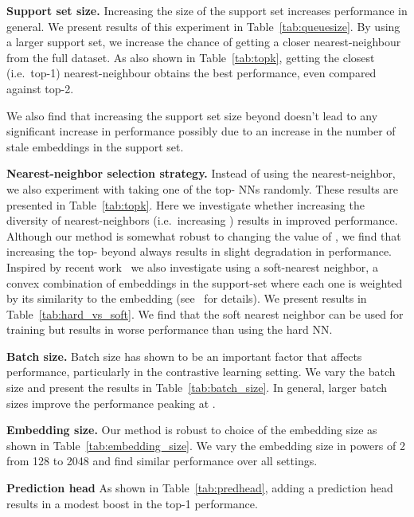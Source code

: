 \noindent \textbf{Support set size.} Increasing the size of the support set increases performance in general. We present results of this experiment in Table~\ref{tab:queuesize}.  
By using a larger support set, we increase the chance of getting a closer nearest-neighbour from the full dataset. As also shown in Table~\ref{tab:topk}, getting the closest (i.e.\ top-1) nearest-neighbour obtains the best performance, even compared against top-2. 

We also find that increasing the support set size beyond  doesn't lead to any significant increase in performance possibly due to an increase in the number of stale embeddings in the support set.




\noindent \textbf{Nearest-neighbor selection strategy.} 
Instead of using the nearest-neighbor, we also experiment with taking one of the top- NNs randomly. These results are presented in Table~\ref{tab:topk}. Here we investigate whether increasing the diversity of nearest-neighbors (i.e.\ increasing ) results in improved performance. 
Although our method is somewhat robust to changing the value of , we find that increasing the top- beyond  always results in slight degradation in performance. 
Inspired by recent work~\cite{dwibedi2019temporal, frosst2019analyzing} we also investigate using a soft-nearest neighbor, a convex combination of embeddings in the support-set where each one is weighted by its similarity to the embedding (see~\cite{dwibedi2019temporal} for details). We present results in Table~\ref{tab:hard_vs_soft}. We find that the soft nearest neighbor can be used for training but results in worse performance than using the hard NN. 

\noindent \textbf{Batch size.} Batch size has shown to be an important factor that affects performance, particularly in the contrastive learning setting. We vary the batch size and present the results in Table~\ref{tab:batch_size}. In general, larger batch sizes improve the performance peaking at .

\noindent \textbf{Embedding size.} Our method is robust to choice of the embedding size as shown in Table~\ref{tab:embedding_size}. We vary the embedding size in powers of 2 from 128 to 2048 and find similar performance over all settings.



\noindent \textbf{Prediction head} As shown in Table~\ref{tab:predhead}, adding a prediction head results in a modest  boost in the top-1 performance. 


